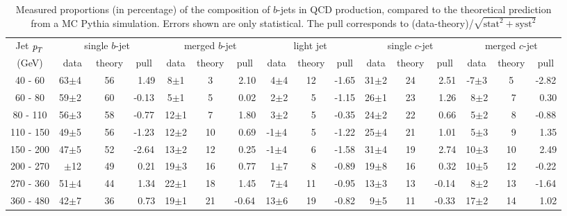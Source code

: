 \begin{table} %
\renewcommand{\arraystretch}{1.2}
\begin{tabular}{ | c || c | c | c || c | c | c || c | c | c || c | c | c || c | c | c ||}
  \hline
  Jet ${\emph{p}_{T}}$ & \multicolumn{3}{c||}{single $b$-jet} & \multicolumn{3}{c||}{merged $b$-jet} 
            & \multicolumn{3}{c||}{~light jet~}    & \multicolumn{3}{c||}{single $c$-jet} 
            & \multicolumn{3}{c||}{merged $c$-jet}
            \\ \cline{2-16}
    (GeV)  &\,data\,&\!\!theory\!\!&\:pull\:&\,data\,&\!\!theory\!\!&\:pull\:&\,data\,&\!\!theory\!\!&\:pull\:&\,data\,&\!\!theory\!\!&\:pull\:&\,data\,&\!\!theory\!\!& pull\\ \hline
   40 - 60 & 63$\pm$4~& 56 & ~1.49 &  8$\pm$1 & 3   & ~2.10 & ~4$\pm$4 &  12 &  -1.65 & 31$\pm$2 & 24 & ~2.51 & -7$\pm$3 &   5 & -2.82\\ 
   60 - 80 & 59$\pm$2~& 60 & -0.13 &  5$\pm$1 & 5   & ~0.02 & ~2$\pm$2 &  ~5 &  -1.15 & 26$\pm$1 & 23 & ~1.26 & ~8$\pm$2 &  ~7 & ~0.30\\ 
   80 - 110& 56$\pm$3~& 58 & -0.77 & 12$\pm$1 & 7   & ~1.80 & ~3$\pm$2 &  ~5 &  -0.35 & 24$\pm$2 & 22 & ~0.66 & ~5$\pm$2 &  ~8 & -0.88\\ 
  110 - 150& 49$\pm$5~& 56 & -1.23 & 12$\pm$2 & 10  & ~0.69 & -1$\pm$4 &  ~5 &  -1.22 & 25$\pm$4 & 21 & ~1.01 & ~5$\pm$3 &  ~9 & ~1.35\\ 
  150 - 200& 47$\pm$5~& 52 & -2.64 & 13$\pm$2 & 12  & ~0.25 & -1$\pm$4 &  ~6 &  -1.58 & 31$\pm$4 & 19 & ~2.74 & 10$\pm$3 &  10 & ~2.49\\ 
  200 - 270&\!\!51$\pm$12\!\!& 49 & ~0.21 & 19$\pm$3 & 16  & ~0.77 & ~1$\pm$7 &  ~8 &  -0.89 & 19$\pm$8 & 16 & ~0.32 & 10$\pm$5 &  12 & -0.22\\ 
  270 - 360& 51$\pm$4~& 44 & ~1.34 & 22$\pm$1 & 18  & ~1.45 & ~7$\pm$4 &  11 &  -0.95 & 13$\pm$3 & 13 & -0.14 & ~8$\pm$2 &  13 & -1.64\\
  360 - 480& 42$\pm$7~& 36 & ~0.73 & 19$\pm$1 & 21  & -0.64 & 13$\pm$6 &  19 &  -0.82 & ~9$\pm$5 & 11 & -0.33 & 17$\pm$2 &  14 & ~1.02\\ \hline
\end{tabular}
\caption{Measured proportions (in percentage) of the composition of $b$-jets in QCD production, compared to the theoretical prediction from a MC {\sc Pythia} simulation. Errors shown are only statistical. The pull corresponds to (data-theory)/$\sqrt{\text{stat}^2+\text{syst}^2}$}
\label{tb:fitfractions}
\end{table}
                   



